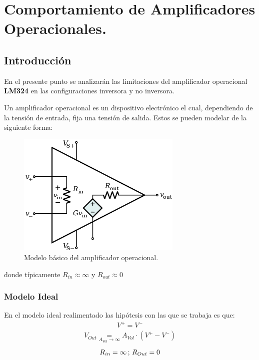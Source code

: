 

\newcommand\underrel[2]{\mathrel{\mathop{#2}\limits_{#1}}}

\usepackage{circuitikz}
\usepackage{xcolor}
\usepackage{amsmath}




\section{Comportamiento de Amplificadores Operacionales.}

\subsection{Introducción}
En el presente punto se analizarán las limitaciones del amplificador operacional  \textbf{LM324} en las configuraciones inversora y no inversora.

Un amplificador operacional es un dispositivo electrónico el cual, dependiendo de la tensión de entrada, fija una tensión de salida. Estos se pueden modelar de la siguiente forma:
\begin{figure}[H]	
	\centering
	\includegraphics[width=0.7\textwidth]{Ejercicio1/Imagenes/Basicopamp.png}
	\caption{Modelo básico del amplificador operacional.}
	\label{fig:Basicopamp}
\end{figure}
donde típicamente $R_{in}\approx \infty$ y $R_{out} \approx 0$

\subsubsection{Modelo Ideal}
En el modelo ideal realimentado las hipótesis con las que se trabaja es que:
\begin{align} V^+ = V^- \end{align}
\begin{align}V_{Out} \underrel{A_{Vol}\to \infty}{=} A_{Vol} \cdot (V^+ - V^-) \end{align}
\begin{align} R_{in}=\infty   \thinspace;\thinspace R_{Out} = 0 \end{align}

